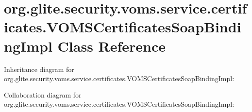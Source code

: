 \hypertarget{classorg_1_1glite_1_1security_1_1voms_1_1service_1_1certificates_1_1VOMSCertificatesSoapBindingImpl}{
\section{org.glite.security.voms.service.certificates.VOMSCertificatesSoapBindingImpl Class Reference}
\label{classorg_1_1glite_1_1security_1_1voms_1_1service_1_1certificates_1_1VOMSCertificatesSoapBindingImpl}
}


Inheritance diagram for org.glite.security.voms.service.certificates.VOMSCertificatesSoapBindingImpl:


Collaboration diagram for org.glite.security.voms.service.certificates.VOMSCertificatesSoapBindingImpl:
